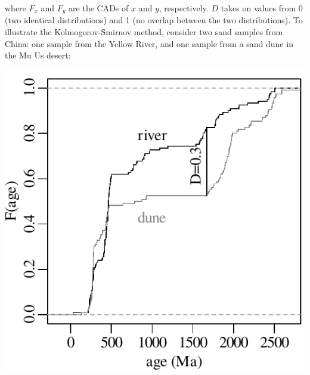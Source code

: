 \begin{refsection}
\noindent where $F_x$ and $F_y$ are the CADs of $x$ and $y$,
respectively.  $D$ takes on values from 0 (two identical
distributions) and 1 (no overlap between the two distributions). To
illustrate the Kolmogorov-Smirnov method, consider two sand samples
from China: one sample from the Yellow River, and one sample from a
sand dune in the Mu Us desert:

\noindent\begin{minipage}[t][][b]{.4\textwidth}
  \includegraphics[width=\textwidth]{../figures/KS.pdf}\\
\end{minipage}
\begin{minipage}[t][][t]{.6\textwidth}
  \label{fig:KS}
\end{minipage}


\end{refsection}
